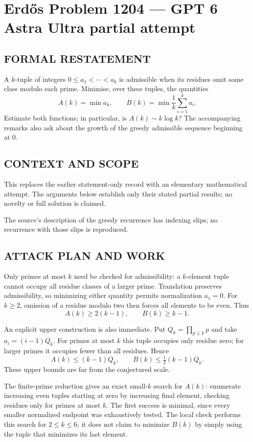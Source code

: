 \section*{Erd\H{o}s Problem 1204 --- GPT 6 Astra Ultra partial attempt}


\subsection*{FORMAL RESTATEMENT}
A $k$-tuple of integers $0\leq a_1<\cdots<a_k$ is admissible when its residues omit some class modulo each prime. Minimise, over these tuples, the quantities
\[A(k)=\min a_k,\qquad B(k)=\min\frac1k\sum_{i=1}^k a_i.\]
Estimate both functions; in particular, is $A(k)\sim k\log k$? The accompanying remarks also ask about the growth of the greedy admissible sequence beginning at $0$.

\subsection*{CONTEXT AND SCOPE}
This replaces the earlier statement-only record with an elementary mathematical attempt. The arguments below establish only their stated partial results; no novelty or full solution is claimed.

The source's description of the greedy recurrence has indexing slips; no recurrence with those slips is reproduced.

\subsection*{ATTACK PLAN AND WORK}
Only primes at most $k$ need be checked for admissibility: a $k$-element tuple
cannot occupy all residue classes of a larger prime. Translation preserves
admissibility, so minimizing either quantity permits normalization $a_1=0$.
For $k\ge2$, omission of a residue modulo two then forces all elements to be
even. Thus
\[A(k)\ge2(k-1),\qquad B(k)\ge k-1.\tag{1}\]

An explicit upper construction is also immediate. Put
$Q_k=\prod_{p\le k}p$ and take $a_i=(i-1)Q_k$.
For primes at most $k$ this tuple occupies only residue zero; for larger
primes it occupies fewer than all residues. Hence
\[A(k)\le(k-1)Q_k,\qquad B(k)\le\tfrac12(k-1)Q_k.\tag{2}\]
These upper bounds are far from the conjectured scale.

The finite-prime reduction gives an exact small-$k$ search for $A(k)$:
enumerate increasing even tuples starting at zero by increasing final element,
checking residues only for primes at most $k$. The first success is minimal,
since every smaller normalized endpoint was exhaustively tested. The local
check performs this search for $2\le k\le6$; it does not claim to minimize
$B(k)$ by simply using the tuple that minimizes its last element.

